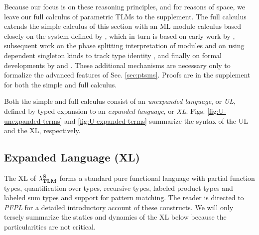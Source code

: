 \documentclass[acmsmall,review,anonymous]{acmart}\settopmatter{printfolios=true,printccs=false,printacmref=false}
\begin{document}
Because our focus is on these reasoning principles, and for reasons of space, we leave our full calculus of parametric TLMs to the supplement. The full calculus extends the simple calculus of this section with an ML module calculus based closely on the system defined by \citet{pfple1}, which in turn is based on early work by \citet{MacQueen:1984:MSM:800055.802036,DBLP:conf/popl/MacQueen86}, subsequent work on the phase splitting interpretation of modules \cite{harper1989higher} and on using dependent singleton kinds to track type identity \cite{stone2006extensional,DBLP:conf/lfmtp/Crary09}, and finally on formal developments by \citet{dreyer2005understanding} and \citet{conf/popl/LeeCH07}. These additional mechanisms are necessary only to formalize the advanced features of Sec. \ref{sec:ptsms}. Proofs are in the supplement for both the simple and full calculus.


Both the simple and full calculus consist of an \emph{unexpanded language}, or \emph{UL}, defined by typed expansion to an \emph{expanded language}, or \emph{XL}. Figs. \ref{fig:U-unexpanded-terms}  and \ref{fig:U-expanded-terms} summarize the syntax of the UL and  the XL, respectively. %

\subsection{Expanded Language (XL)}\label{sec:s-XL}
The {XL} of $\mathsf{\lambda}_\textbf{TLM}^\textbf{S}$ forms a standard pure functional language with partial function types, quantification over types, recursive types, labeled product types and labeled sum types and support for pattern matching. 
 The reader is directed to \emph{PFPL} \cite{pfple1} for a detailed introductory account of these constructs. We will only tersely summarize the statics and dynamics of the XL below because the particularities are not critical.
\end{document}
